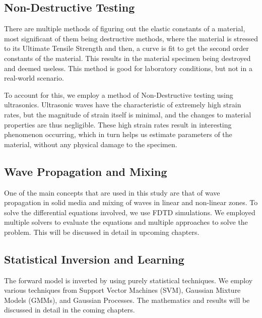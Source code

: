\subsection{Non-Destructive Testing}
There are multiple methods of figuring out the elastic constants of a material, most significant of them being destructive methods, where the material is stressed to its Ultimate Tensile Strength and then, a curve is fit to get the second order constants of the material. This results in the material specimen being destroyed and deemed useless. This method is good for laboratory conditions, but not in a real-world scenario.

To account for this, we employ a method of Non-Destructive testing using ultrasonics. Ultrasonic waves have the characteristic of extremely high strain rates, but the magnitude of strain itself is minimal, and the changes to material properties are thus negligible. These high strain rates result in interesting phenomenon occurring, which in turn helps us estimate parameters of the material, without any physical damage to the specimen.

\subsection{Wave Propagation and Mixing}
One of the main concepts that are used in this study are that of wave propagation in solid media and mixing of waves in linear and non-linear zones. To solve the differential equations involved, we use FDTD simulations. We employed multiple solvers to evaluate the equations and multiple approaches to solve the problem. This will be discussed in detail in upcoming chapters.

\subsection{Statistical Inversion and Learning}
The forward model is inverted by using purely statistical techniques. We employ various techniques from Support Vector Machines (SVM), Gaussian Mixture Models (GMMs), and Gaussian Processes. The mathematics and results will be discussed in detail in the coming chapters.
